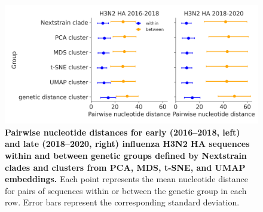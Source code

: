 \begin{figure}[!h]
\includegraphics[width=\columnwidth]{figures/within_between_influenza.png}
\caption{{\bf Pairwise nucleotide distances for early (2016--2018, left) and late (2018--2020, right) influenza H3N2 HA sequences within and between genetic groups defined by Nextstrain clades and clusters from PCA, MDS, t-SNE, and UMAP embeddings.}
  Each point represents the mean nucleotide distance for pairs of sequences within or between the genetic group in each row.
  Error bars represent the corresponding standard deviation.}\label{S_Fig_flu_within_between_group_distances}
\end{figure}

